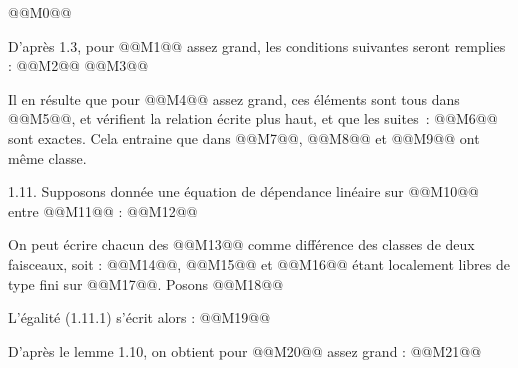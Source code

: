 
@@M0@@

D'après 1.3,
pour @@M1@@ assez grand, les conditions suivantes seront remplies :
@@M2@@
@@M3@@

Il en résulte que pour @@M4@@ assez grand, ces éléments sont tous dans @@M5@@, et vérifient la relation écrite plus haut, et que les suites~:
@@M6@@
sont exactes. Cela entraine que dans @@M7@@, @@M8@@ et @@M9@@ ont même classe.

1.11. Supposons donnée une équation de dépendance linéaire sur @@M10@@ entre @@M11@@ :
@@M12@@

On peut écrire chacun des @@M13@@ comme différence des classes de deux faisceaux, soit : @@M14@@, @@M15@@ et @@M16@@ étant localement libres de type fini sur @@M17@@. Posons
@@M18@@

L'égalité (1.11.1) s'écrit alors :
@@M19@@

D'après le lemme 1.10, on obtient pour @@M20@@ assez grand :
@@M21@@
